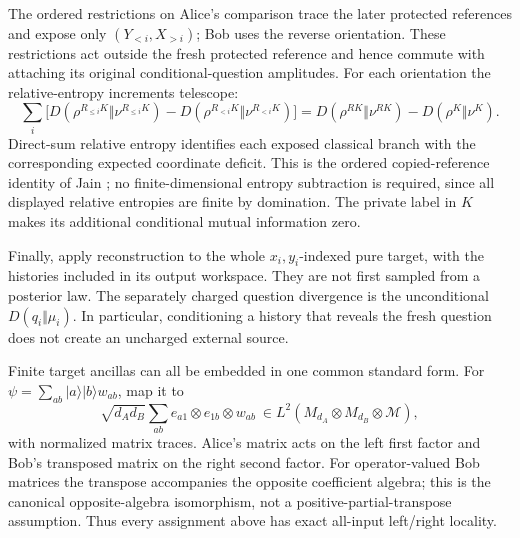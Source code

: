 \documentclass[11pt,reqno]{amsart}
\numberwithin{equation}{section}
\begin{document}
The ordered restrictions on Alice's comparison trace the later protected references and expose only \((Y_{<i},X_{>i})\); Bob uses the reverse orientation. These restrictions act outside the fresh protected reference and hence commute with attaching its original conditional-question amplitudes. For each orientation the relative-entropy increments telescope: \[
 \sum_i\bigl[D(\rho^{R_{\le i}K}\Vert\nu^{R_{\le i}K})
             -D(\rho^{R_{<i}K}\Vert\nu^{R_{<i}K})\bigr]
 =D(\rho^{RK}\Vert\nu^{RK})-D(\rho^K\Vert\nu^K).
\] Direct-sum relative entropy identifies each exposed classical branch with the corresponding expected coordinate deficit. This is the ordered copied-reference identity of Jain \cite[Lemma 2.24]{Jain}; no finite-dimensional entropy subtraction is required, since all displayed relative entropies are finite by domination. The private label in \(K\) makes its additional conditional mutual information zero.

Finally, apply reconstruction to the whole \(x_i,y_i\)-indexed pure target, with the histories included in its output workspace. They are not first sampled from a posterior law. The separately charged question divergence is the unconditional \(D(q_i\Vert\mu_i)\). In particular, conditioning a history that reveals the fresh question does not create an uncharged external source.

Finite target ancillas can all be embedded in one common standard form. For \(\psi=\sum_{ab}|a\rangle|b\rangle w_{ab}\), map it to \[
 \sqrt{d_Ad_B}\sum_{ab} e_{a1}\otimes e_{1b}\otimes w_{ab}
 \ \in L^2(M_{d_A}\otimes M_{d_B}\otimes\mathcal M),
\] with normalized matrix traces. Alice's matrix acts on the left first factor and Bob's transposed matrix on the right second factor. For operator-valued Bob matrices the transpose accompanies the opposite coefficient algebra; this is the canonical opposite-algebra isomorphism, not a positive-partial-transpose assumption. Thus every assignment above has exact all-input left/right locality.
\end{document}

